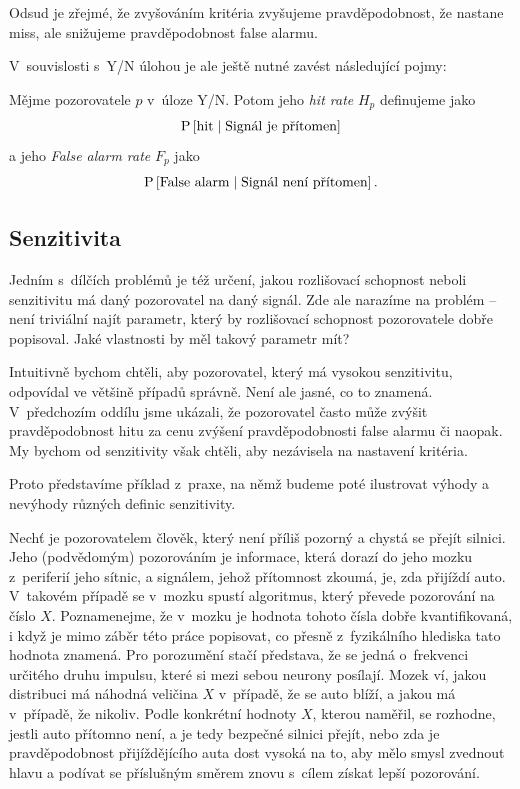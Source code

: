 Odsud je zřejmé, že zvyšováním kritéria zvyšujeme pravděpodobnost, že nastane
miss, ale snižujeme pravděpodobnost false alarmu.

V~souvislosti s~Y/N úlohou je ale ještě nutné zavést následující pojmy:

\begin{definice}\label{hitrate}
Mějme pozorovatele $p$ v~úloze Y/N. Potom jeho \emph{hit rate\/} $H_p$ definujeme jako $$\P{\text{hit}\mid\text{Signál je přítomen}}$$ a jeho \emph{False alarm rate\/} $F_p$ jako $$\P{\text{False alarm}\mid\text{Signál není přítomen}}.$$
\end{definice}

\subsection{Senzitivita}

Jedním s~dílčích problémů je též určení, jakou rozlišovací schopnost neboli senzitivitu má daný
pozorovatel na daný signál. Zde ale narazíme na problém -- není triviální
najít parametr, který by rozlišovací schopnost pozorovatele dobře popisoval.
Jaké vlastnosti by měl takový parametr mít?

Intuitivně bychom chtěli, aby pozorovatel, který má vysokou senzitivitu,
odpovídal ve většině případů správně. Není ale jasné, co to znamená. V~předchozím
oddílu jsme ukázali, že pozorovatel často může zvýšit pravděpodobnost
hitu za cenu zvýšení pravděpodobnosti false alarmu či naopak. My bychom od senzitivity
však chtěli, aby nezávisela na nastavení kritéria.

Proto představíme příklad z~praxe, na němž budeme poté ilustrovat výhody a 
nevýhody různých definic senzitivity.

Nechť je pozorovatelem člověk, který není
příliš pozorný a chystá se přejít silnici. Jeho (podvědomým) pozorováním je
informace, která dorazí do jeho mozku z~periferií jeho sítnic, a signálem, jehož
přítomnost zkoumá, je, zda přijíždí auto. V~takovém případě se v~mozku spustí
algoritmus, který převede pozorování na číslo $X$. Poznamenejme, že v~mozku je
hodnota tohoto čísla dobře kvantifikovaná, i když je mimo záběr této práce
popisovat, co přesně z~fyzikálního hlediska tato hodnota znamená. Pro
porozumění stačí představa, že se jedná o~frekvenci určitého druhu impulsu,
které si mezi sebou neurony posílají. Mozek ví, jakou distribuci má náhodná
veličina $X$ v~případě, že se auto blíží, a jakou má v~případě, že nikoliv.
Podle konkrétní hodnoty $X$, kterou naměřil, se rozhodne, jestli auto přítomno
není, a je tedy bezpečné silnici přejít, nebo zda je pravděpodobnost
přijíždějícího auta dost vysoká na to, aby mělo smysl zvednout hlavu a podívat
se příslušným směrem znovu s~cílem získat lepší pozorování.

